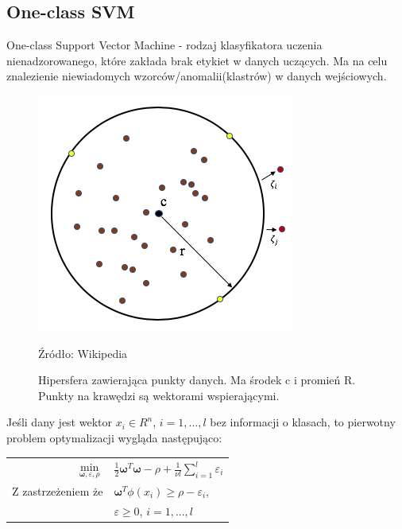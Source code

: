 \documentclass[paper=a4, fontsize=11pt]{scrartcl} %
\numberwithin{equation}{section} %
\numberwithin{figure}{section} %
\newcommand*{\captionsource}[2]{%
  \caption[{#1}]{%
      #1}
    Źródło: #2%
}
\begin{document}
\subsection{One-class SVM}
    \par One-class Support Vector Machine - rodzaj klasyfikatora uczenia
    nienadzorowanego, które zakłada brak etykiet w danych uczących. Ma na celu
    znalezienie niewiadomych wzorców/anomalii(klastrów) w danych wejściowych.  

    \begin{figure}[h]
        \begin{center}
            \includegraphics[scale=0.4]{./img/one-class-circle.png}
            \captionsource{Hipersfera zawierająca punkty danych. Ma środek c i promień R.
                            Punkty na krawędzi są wektorami wspierającymi.}{Wikipedia}
            \label{fig:one_class}
        \end{center}
    \end{figure}

    \par Jeśli dany jest wektor $x_i\in R^n$, $i=1,...,l$ bez informacji o klasach,
    to pierwotny problem optymalizacji wygląda następująco:

    \begin{center}
        \begin{tabular}{rl}
            $\min\limits_{\pmb{\omega},\varepsilon,\rho}$ & $\frac{1}{2}\pmb{\omega}^T\pmb{\omega} -
            \rho + \frac{1}{\nu l}\sum\limits_{i=1}^{l}\varepsilon_i$ \\
            Z zastrzeżeniem że & $\pmb{\omega}^T\phi(x_i)\geq\rho - \varepsilon_i$,\\
                               & $\varepsilon \geq 0$, $i=1,...,l$
        \end{tabular}
    \end{center}
\end{document}
